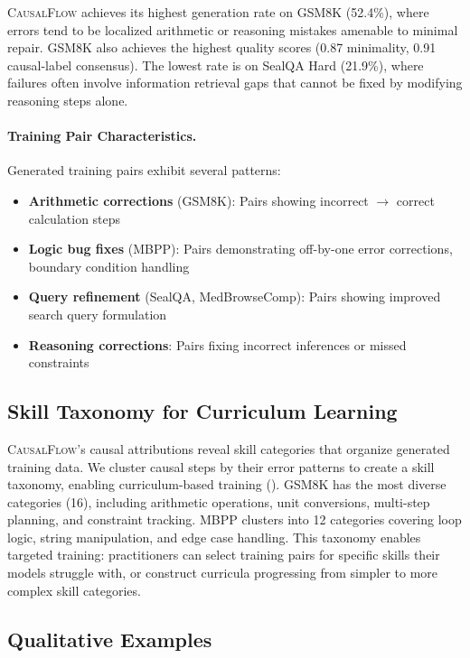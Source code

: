 \documentclass{article}
\theoremstyle{plain}
\theoremstyle{definition}
\theoremstyle{remark}
\begin{document}
\textsc{CausalFlow} achieves its highest generation rate on GSM8K (52.4\%), where errors tend to be localized arithmetic or reasoning mistakes amenable to minimal repair. GSM8K also achieves the highest quality scores (0.87 minimality, 0.91 causal-label consensus). The lowest rate is on SealQA Hard (21.9\%), where failures often involve information retrieval gaps that cannot be fixed by modifying reasoning steps alone.

\paragraph{Training Pair Characteristics.}
Generated training pairs exhibit several patterns:
\begin{itemize}
    \item \textbf{Arithmetic corrections} (GSM8K): Pairs showing incorrect $\rightarrow$ correct calculation steps
    \item \textbf{Logic bug fixes} (MBPP): Pairs demonstrating off-by-one error corrections, boundary condition handling
    \item \textbf{Query refinement} (SealQA, MedBrowseComp): Pairs showing improved search query formulation
    \item \textbf{Reasoning corrections}: Pairs fixing incorrect inferences or missed constraints
\end{itemize}

\subsection{Skill Taxonomy for Curriculum Learning}

\textsc{CausalFlow}'s causal attributions reveal skill categories that organize generated training data. We cluster causal steps by their error patterns to create a skill taxonomy, enabling curriculum-based training (). GSM8K has the most diverse categories (16), including arithmetic operations, unit conversions, multi-step planning, and constraint tracking. MBPP clusters into 12 categories covering loop logic, string manipulation, and edge case handling. This taxonomy enables targeted training: practitioners can select training pairs for specific skills their models struggle with, or construct curricula progressing from simpler to more complex skill categories.

\subsection{Qualitative Examples}
\end{document}
